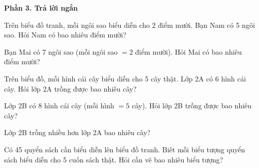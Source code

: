 \textbf{Phần 3. Trả lời ngắn}

\begin{ex} %
Trên biểu đồ tranh, mỗi ngôi sao biểu diễn cho 2 điểm mười. Bạn Nam có 5 ngôi sao. Hỏi Nam có bao nhiêu điểm mười?
\end{ex}

\begin{ex} %
Bạn Mai có 7 ngôi sao (mỗi ngôi sao $= 2$ điểm mười). Hỏi Mai có bao nhiêu điểm mười?
\end{ex}

\begin{ex} %
Trên biểu đồ, mỗi hình cái cây biểu diễn cho 5 cây thật. Lớp 2A có 6 hình cái cây. Hỏi lớp 2A trồng được bao nhiêu cây?
\end{ex}

\begin{ex} %
Lớp 2B có 8 hình cái cây (mỗi hình $= 5$ cây). Hỏi lớp 2B trồng được bao nhiêu cây?
\end{ex}

\begin{ex} %
Lớp 2B trồng nhiều hơn lớp 2A bao nhiêu cây?
\end{ex}

\begin{ex} %
Có 45 quyển sách cần biểu diễn lên biểu đồ tranh. Biết mỗi biểu tượng quyển sách biểu diễn cho 5 cuốn sách thật. Hỏi cần vẽ bao nhiêu biểu tượng?
\end{ex}
